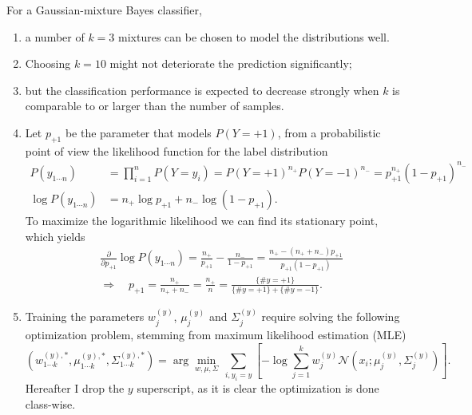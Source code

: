 \documentclass[a4paper, 10pt]{article}
\begin{document}
For a Gaussian-mixture Bayes classifier,
\begin{enumerate}[label=(\alph*), resume]
    \item a number of $k=3$ mixtures can be chosen to model the distributions well.
    \item Choosing $k=10$ might not deteriorate the prediction significantly;
    \item but the classification performance is expected to decrease strongly when $k$ is comparable to or larger than the number of samples.
    \item Let $p_{+1}$ be the parameter that models $P(Y=+1)$, from a probabilistic point of view the likelihood function for the label distribution
    \begin{equation}
        \begin{aligned}
            P(y_{1\cdots n}) &= \prod_{i=1}^n P(Y=y_i) = P(Y=+1)^{n_+} P(Y=-1)^{n_-} = p_{+1}^{n_+} \left(1 - p_{+1}\right)^{n_-} \\ 
            \log P(y_{1\cdots n}) &= n_+ \log p_{+1} + n_- \log \left(1 - p_{+1}\right).
        \end{aligned}
    \end{equation}
    To maximize the logarithmic likelihood we can find its stationary point, which yields
    \begin{equation}
        \begin{aligned}
            & \frac{\partial}{\partial p_{+1}} \log P(y_{1\cdots n}) = \frac{n_+}{p_{+1}} - \frac{n_-}{1 - p_{+1}} = \frac{n_+ - \left(n_+ + n_-\right)p_{+1}}{p_{+1} \left(1 - p_{+1}\right)} \\ 
            & \Longrightarrow \quad p_{+1} = \frac{n_+}{n_+ + n_-} = \frac{n_+}{n} = \frac{\{\#y=+1\}}{\{\#y=+1\} + \{\#y=-1\}}.
        \end{aligned}
    \end{equation}

    \item Training the parameters $w_j^{(y)}$, $\mu_j^{(y)}$ and $\Sigma_j^{(y)}$ require solving the following optimization problem, stemming from maximum likelihood estimation (MLE)
    \begin{equation}
        \left(w_{1\cdots k}^{(y), *}, \mu_{1\cdots k}^{(y), *}, \Sigma_{1\cdots k}^{(y), *}\right) = \arg \min_{w, \mu, \Sigma} \, \sum_{i, y_i = y} \left[ - \log \sum_{j=1}^k w_j^{(y)} \mathcal{N} \left(x_i ; \mu_j^{(y)}, \Sigma_j^{(y)}\right)\right].
    \end{equation}
    Hereafter I drop the $y$ superscript, as it is clear the optimization is done class-wise.


\end{enumerate}
\end{document}
